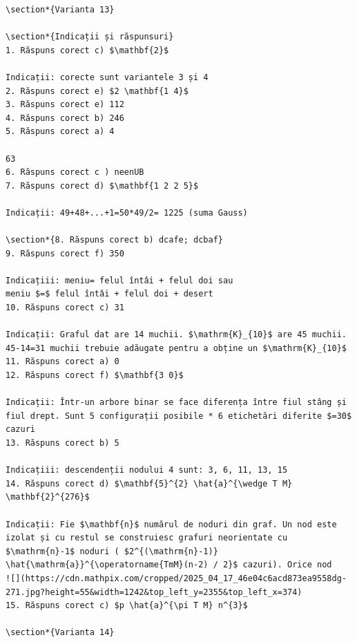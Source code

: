 \documentclass[10pt]{article}
\begin{document}
\begin{verbatim}
\section*{Varianta 13}

\section*{Indicații și răspunsuri}
1. Răspuns corect c) $\mathbf{2}$

Indicații: corecte sunt variantele 3 și 4
2. Răspuns corect e) $2 \mathbf{1 4}$
3. Răspuns corect e) 112
4. Răspuns corect b) 246
5. Răspuns corect a) 4

63
6. Răspuns corect c ) neenUB
7. Răspuns corect d) $\mathbf{1 2 2 5}$

Indicații: 49+48+...+1=50*49/2= 1225 (suma Gauss)

\section*{8. Răspuns corect b) dcafe; dcbaf}
9. Răspuns corect f) 350

Indicațiii: meniu= felul întâi + felul doi sau
meniu $=$ felul întâi + felul doi + desert
10. Răspuns corect c) 31

Indicații: Graful dat are 14 muchii. $\mathrm{K}_{10}$ are 45 muchii. 45-14=31 muchii trebuie adăugate pentru a obține un $\mathrm{K}_{10}$
11. Răspuns corect a) 0
12. Răspuns corect f) $\mathbf{3 0}$

Indicații: Într-un arbore binar se face diferența între fiul stâng și fiul drept. Sunt 5 configurații posibile * 6 etichetări diferite $=30$ cazuri
13. Răspuns corect b) 5

Indicațiii: descendenții nodului 4 sunt: 3, 6, 11, 13, 15
14. Răspuns corect d) $\mathbf{5}^{2} \hat{a}^{\wedge T M} \mathbf{2}^{276}$

Indicații: Fie $\mathbf{n}$ numărul de noduri din graf. Un nod este izolat și cu restul se construiesc grafuri neorientate cu $\mathrm{n}-1$ noduri ( $2^{(\mathrm{n}-1)} \hat{\mathrm{a}}^{\operatorname{TmM}(n-2) / 2}$ cazuri). Orice nod
![](https://cdn.mathpix.com/cropped/2025_04_17_46e04c6acd873ea9558dg-271.jpg?height=55&width=1242&top_left_y=2355&top_left_x=374)
15. Răspuns corect c) $p \hat{a}^{\pi T M} n^{3}$

\section*{Varianta 14}


\end{verbatim}
\end{document}

